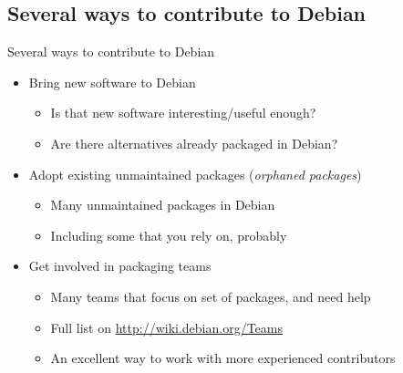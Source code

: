 \documentclass[10pt,final]{beamer}
\begin{document}
\subsection{Several ways to contribute to Debian}
\begin{frame}{Several ways to contribute to Debian}
\begin{itemize}
\item Bring new software to Debian
\begin{itemize}
\item Is that new software interesting/useful enough?
\item Are there alternatives already packaged in Debian?
\end{itemize}
\br
\item Adopt existing unmaintained packages (\textsl{orphaned packages})
\begin{itemize}
	\item Many unmaintained packages in Debian
	\item Including some that you rely on, probably
\end{itemize}
\br
\item Get involved in packaging teams
\begin{itemize}
\item Many teams that focus on set of packages, and need help
\item Full list on \url{http://wiki.debian.org/Teams}
\item An excellent way to work with more experienced contributors
\end{itemize}
\end{itemize}
\end{frame}
\end{document}

